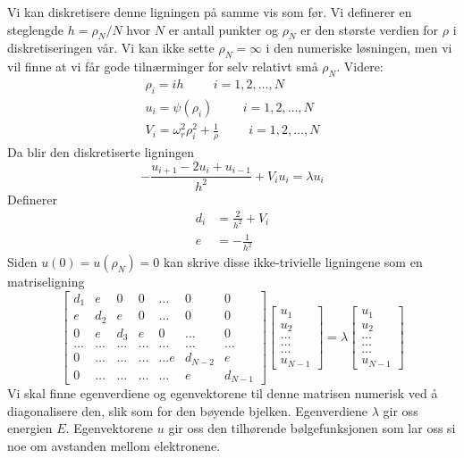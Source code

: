 \documentclass[reprint,english,notitlepage]{revtex4-1}
\begin{document}
	Vi kan diskretisere denne ligningen på samme vis som før. Vi definerer en steglengde $h = \rho_N / N$ hvor $N$ er antall punkter og $\rho_N$ er den største verdien for $\rho$ i diskretiseringen vår. Vi kan ikke sette $\rho_N = \infty$ i den numeriske løsningen, men vi vil finne at vi får gode tilnærminger for selv relativt små $\rho_N$. Videre:
	\begin{equation*}
	\begin{aligned}
	\rho_i = ih \hspace{1cm} i=1,2,\dots , N \\
	u_i = \psi(\rho_i) \hspace{1cm} i=1,2,\dots , N \\
	V_i = \omega_r^2 \rho_i^2 + \frac{1}{\rho} \hspace{1cm} i=1,2,\dots , N
	\end{aligned}
	\end{equation*}
	Da blir den diskretiserte ligningen
	\begin{equation*}
	-\frac{u_{i+1} -2u_i +u_{i-1} }{h^2}+V_iu_i  = \lambda u_i
	\end{equation*}
	Definerer
	\begin{equation*}
	\begin{aligned}
	d_i&=\frac{2}{h^2}+V_i \\
	e &= -\frac{1}{h^2}
	\end{aligned}
	\end{equation*}
	Siden $u(0) = u(\rho_N) = 0$ kan skrive disse ikke-trivielle ligningene som en matriseligning
	\begin{equation*}
	\begin{bmatrix}d_1 & e & 0   & 0    & \dots  &0     & 0 \\
	e & d_2 & e & 0    & \dots  &0     &0 \\
	0   & e & d_3 & e  &0       &\dots & 0\\
	\dots  & \dots & \dots & \dots  &\dots      &\dots & \dots\\
	0   & \dots & \dots & \dots  &\dots  e     &d_{N-2} & e\\
	0   & \dots & \dots & \dots  &\dots       &e & d_{N-1}
	\end{bmatrix}  \begin{bmatrix} u_{1} \\
	u_{2} \\
	\dots\\ \dots\\ \dots\\
	u_{N-1}
	\end{bmatrix}=\lambda \begin{bmatrix} u_{1} \\
	u_{2} \\
	\dots\\ \dots\\ \dots\\
	u_{N-1}
	\end{bmatrix}
	\end{equation*}
	Vi skal finne egenverdiene og egenvektorene til denne matrisen numerisk ved å diagonalisere den, slik som for den bøyende bjelken. Egenverdiene $\lambda$ gir oss energien $E$. Egenvektorene $u$ gir oss den tilhørende bølgefunksjonen som lar oss si noe om avstanden mellom elektronene.
	
\end{document}
